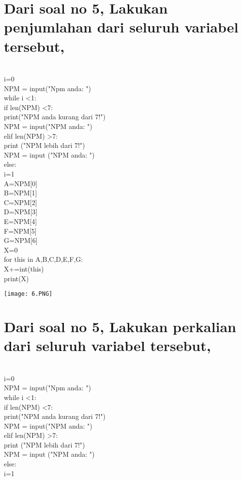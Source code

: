 \documentclass{article}
\begin{document}
\section{Dari soal no 5, Lakukan penjumlahan dari seluruh variabel tersebut,}\\
i=0\\
NPM = input("Npm anda: ")\\
while i <1:\\
    if len(NPM) <7:\\
        print("NPM anda kurang dari 7!")\\
        NPM = input("NPM anda: ")\\
    elif len(NPM) >7:\\
        print ("NPM lebih dari 7!")\\
        NPM = input ("NPM anda: ")\\
    else:\\
        i=1\\

A=NPM[0]\\
B=NPM[1]\\
C=NPM[2]\\
D=NPM[3]\\
E=NPM[4]\\
F=NPM[5]\\
G=NPM[6]\\

X=0\\

for this in A,B,C,D,E,F,G:\\
    X+=int(this)\\
print(X)\\
\begin{center}
    \texttt{[image: 6.PNG]}
\end{center}

\section{Dari soal no 5, Lakukan perkalian dari seluruh variabel tersebut,}\\
i=0\\
NPM = input("Npm anda: ")\\
while i <1:\\
    if len(NPM) <7:\\
        print("NPM anda kurang dari 7!")\\
        NPM = input("NPM anda: ")\\
    elif len(NPM) >7:\\
        print ("NPM lebih dari 7!")\\
        NPM = input ("NPM anda: ")\\
    else:\\
        i=1\\
\end{document}
